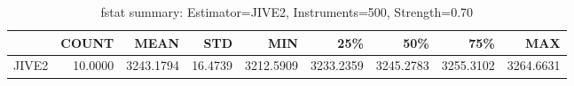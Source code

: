 \begin{table}[ht]
\centering
\caption{fstat summary: Estimator=JIVE2, Instruments=500, Strength=0.70}
\begin{tabular}{lrrrrrrrr}
\toprule
 & COUNT & MEAN & STD & MIN & 25\% & 50\% & 75\% & MAX \\
\midrule
JIVE2 & 10.0000 & 3243.1794 & 16.4739 & 3212.5909 & 3233.2359 & 3245.2783 & 3255.3102 & 3264.6631 \\
\bottomrule
\end{tabular}
\end{table}
